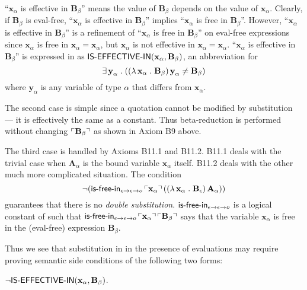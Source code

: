 \documentclass[fleqn]{llncs}
\begin{document}
``$\textbf{x}_\alpha$ is effective in $\textbf{B}_\beta$'' means the
value of $\textbf{B}_\beta$ depends on the value of
$\textbf{x}_\alpha$.  Clearly, if $\textbf{B}_\beta$ is eval-free,
``$\textbf{x}_\alpha$ is effective in $\textbf{B}_\beta$'' implies
``$\textbf{x}_\alpha$ is free in $\textbf{B}_\beta$''.  However,
``$\textbf{x}_\alpha$ is effective in $\textbf{B}_\beta$'' is a refinement of
``$\textbf{x}_\alpha$ is free in $\textbf{B}_\beta$'' on eval-free
expressions since $\textbf{x}_\alpha$ is free in $\textbf{x}_\alpha =
\textbf{x}_\alpha$, but $\textbf{x}_\alpha$ is not effective in
$\textbf{x}_\alpha = \textbf{x}_\alpha$.  ``$\textbf{x}_\alpha$ is
effective in $\textbf{B}_\beta$'' is expressed in {\churchqe} as
$\mbox{\sf IS-EFFECTIVE-IN}(\textbf{x}_\alpha,\textbf{B}_\beta)$, an
abbreviation for \[\exists\, \textbf{y}_\alpha \mathrel. ((\lambda\,
\textbf{x}_\alpha \mathrel. \textbf{B}_\beta) \, \textbf{y}_\alpha \not=
\textbf{B}_\beta)\] where $\textbf{y}_\alpha$ is any variable of type
$\alpha$ that differs from $\textbf{x}_\alpha$.

The second case is simple since a quotation cannot be modified by
substitution --- it is effectively the same as a constant. Thus
beta-reduction is performed without changing
$\ulcorner\textbf{B}_\beta\urcorner$ as shown in Axiom B9 above.

The third case is handled by Axioms B11.1 and B11.2.  B11.1 deals with
the trivial case when $\textbf{A}_\alpha$ is the bound variable
$\textbf{x}_\alpha$ itself.  B11.2 deals with the other much more
complicated situation.  The condition
\[\neg(\mbox{\sf is-free-in}_{\epsilon \rightarrow \epsilon \rightarrow o}
      \, \ulcorner\textbf{x}_\alpha\urcorner \, ((\lambda\,
      \textbf{x}_\alpha \mathrel. \textbf{B}_\epsilon) \,
      \textbf{A}_\alpha))\] guarantees that there is no
      \emph{double substitution}.  $\mbox{\sf is-free-in}_{\epsilon \rightarrow
        \epsilon \rightarrow o}$ is a logical constant of {\churchqe} such
      that $\mbox{\sf is-free-in}_{\epsilon \rightarrow \epsilon \rightarrow o}
      \, \ulcorner\textbf{x}_\alpha\urcorner \,
      \ulcorner\textbf{B}_\beta\urcorner$ says that the variable
      $\textbf{x}_\alpha$ is free in the (eval-free) expression
      $\textbf{B}_\beta$.

Thus we see that substitution in {\churchqe} in the presence of
evaluations may require proving semantic side conditions of the
following two forms:

\be

  \item $\neg
    \mbox{\sf IS-EFFECTIVE-IN}(\textbf{x}_\alpha,\textbf{B}_\beta)$.
\end{document}
